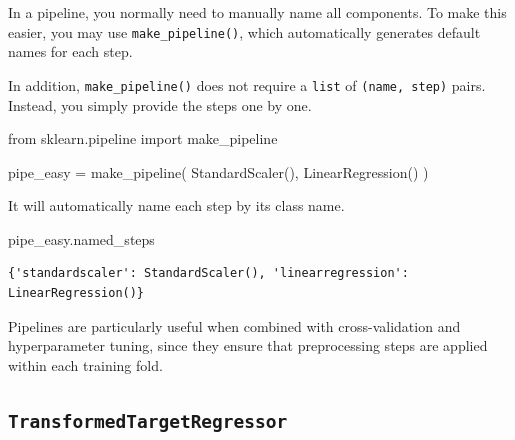 \documentclass[
  letterpaper,
  DIV=11,
  numbers=noendperiod]{scrreprt}
\newenvironment{Shaded}{\begin{snugshade}}{\end{snugshade}}
\newcommand{\ImportTok}[1]{\textcolor[rgb]{0.00,0.46,0.62}{#1}}
\newcommand{\NormalTok}[1]{\textcolor[rgb]{0.00,0.23,0.31}{#1}}
\newcommand{\OperatorTok}[1]{\textcolor[rgb]{0.37,0.37,0.37}{#1}}
\theoremstyle{definition}
\theoremstyle{definition}
\theoremstyle{plain}
\theoremstyle{plain}
\theoremstyle{remark}
\begin{document}
In a pipeline, you normally need to manually name all components. To
make this easier, you may use \texttt{make\_pipeline()}, which
automatically generates default names for each step.

In addition, \texttt{make\_pipeline()} does not require a \texttt{list}
of \texttt{(name,\ step)} pairs. Instead, you simply provide the steps
one by one.

\begin{Shaded}
\begin{Highlighting}[]
\ImportTok{from}\NormalTok{ sklearn.pipeline }\ImportTok{import}\NormalTok{ make\_pipeline}

\NormalTok{pipe\_easy }\OperatorTok{=}\NormalTok{ make\_pipeline(}
\NormalTok{    StandardScaler(),}
\NormalTok{    LinearRegression()}
\NormalTok{)}
\end{Highlighting}
\end{Shaded}

It will automatically name each step by its class name.

\begin{Shaded}
\begin{Highlighting}[]
\NormalTok{pipe\_easy.named\_steps}
\end{Highlighting}
\end{Shaded}

\begin{verbatim}
{'standardscaler': StandardScaler(), 'linearregression': LinearRegression()}
\end{verbatim}

\begin{tcolorbox}[enhanced jigsaw, arc=.35mm, bottomrule=.15mm, bottomtitle=1mm, breakable, colback=white, colbacktitle=quarto-callout-note-color!10!white, colframe=quarto-callout-note-color-frame, coltitle=black, left=2mm, leftrule=.75mm, opacityback=0, opacitybacktitle=0.6, rightrule=.15mm, title=\textcolor{quarto-callout-note-color}{\faInfo}\hspace{0.5em}{Note}, titlerule=0mm, toprule=.15mm, toptitle=1mm]

Pipelines are particularly useful when combined with cross-validation
and hyperparameter tuning, since they ensure that preprocessing steps
are applied within each training fold.

\end{tcolorbox}

\subsection{\texorpdfstring{\texttt{TransformedTargetRegressor}}{TransformedTargetRegressor}}\label{transformedtargetregressor}
\end{document}
